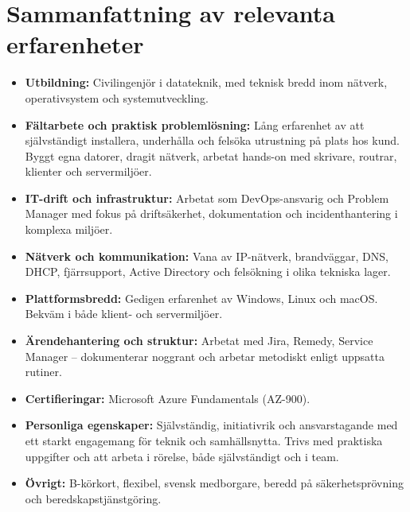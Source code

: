\section*{Sammanfattning av relevanta erfarenheter}

\begin{itemize}
  \item \textbf{Utbildning:} Civilingenjör i datateknik, med teknisk bredd inom nätverk, operativsystem och systemutveckling.
  \item \textbf{Fältarbete och praktisk problemlösning:} Lång erfarenhet av att självständigt installera, underhålla och felsöka utrustning på plats hos kund. Byggt egna datorer, dragit nätverk, arbetat hands-on med skrivare, routrar, klienter och servermiljöer.
  \item \textbf{IT-drift och infrastruktur:} Arbetat som DevOps-ansvarig och Problem Manager med fokus på driftsäkerhet, dokumentation och incidenthantering i komplexa miljöer.
  \item \textbf{Nätverk och kommunikation:} Vana av IP-nätverk, brandväggar, DNS, DHCP, fjärrsupport, Active Directory och felsökning i olika tekniska lager.
  \item \textbf{Plattformsbredd:} Gedigen erfarenhet av Windows, Linux och macOS. Bekväm i både klient- och servermiljöer.
  \item \textbf{Ärendehantering och struktur:} Arbetat med Jira, Remedy, Service Manager – dokumenterar noggrant och arbetar metodiskt enligt uppsatta rutiner.
  \item \textbf{Certifieringar:} Microsoft Azure Fundamentals (AZ-900).
  \item \textbf{Personliga egenskaper:} Självständig, initiativrik och ansvarstagande med ett starkt engagemang för teknik och samhällsnytta. Trivs med praktiska uppgifter och att arbeta i rörelse, både självständigt och i team.
  \item \textbf{Övrigt:} B-körkort, flexibel, svensk medborgare, beredd på säkerhetsprövning och beredskapstjänstgöring.
\end{itemize}
